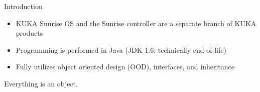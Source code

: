 \documentclass{beamer}
\begin{document}
\begin{frame}{Introduction}
  \begin{itemize}
    \item KUKA Sunrise OS and the Sunrise controller are a separate branch of KUKA products
    \item Programming is performed in Java (JDK 1.6; technically end-of-life)
    \item Fully utilizes object oriented design (OOD), interfaces, and inheritance
  \end{itemize}
\end{frame}

\begin{frame}[standout]
  \alert{Everything} is an object.
\end{frame}
\end{document}
